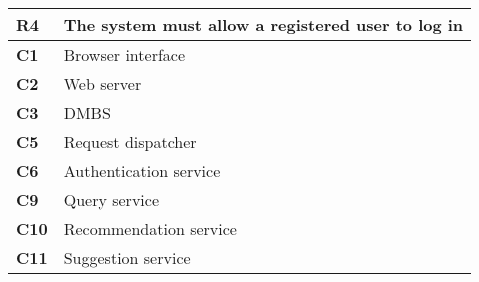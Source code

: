 \begin{table}[H]
    \centering
    \begin{tabular}{|l|m{10cm}|}
        \hline \textbf{R4} & The system must allow a registered user to log in \\
        \hline \textbf{C1} & Browser interface \\
        \hline \textbf{C2} & Web server \\
        \hline \textbf{C3} & DMBS \\
        \hline \textbf{C5} & Request dispatcher \\
        \hline \textbf{C6} & Authentication service \\
        \hline \textbf{C9} & Query service \\
        \hline \textbf{C10} & Recommendation service \\
        \hline \textbf{C11} & Suggestion service \\
        \hline
    \end{tabular}
\end{table}

